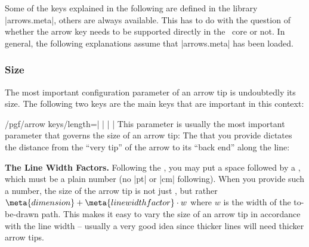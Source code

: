 Some of the keys explained in the following are defined in the library
|arrows.meta|, others are always available. This has to do with the question of
whether the arrow key needs to be supported directly in the \pgfname\ core or
not. In general, the following explanations assume that |arrows.meta| has been
loaded.


\subsubsection{Size}

The most important configuration parameter of an arrow tip is undoubtedly its
size. The following two keys are the main keys that are important in this
context:

\begin{key}{/pgf/arrow keys/length=| |%
        | |}
        \label{length-arrow-key}%
    This parameter is usually the most important parameter that governs the
    size of an arrow tip: The  that you provide dictates the
    distance from the ``very tip'' of the arrow to its ``back end'' along the
    line:
\begin{codeexample}[preamble={\usetikzlibrary{arrows.meta}}]
\end{codeexample}
\begin{codeexample}[preamble={\usetikzlibrary{arrows.meta}}]
\end{codeexample}
\begin{codeexample}[preamble={\usetikzlibrary{arrows.meta}}]
\end{codeexample}

    \medskip
    \noindent \textbf{The Line Width Factors.}
    Following the , you may put a space followed by a
    , which must be a plain number (no |pt| or |cm|
    following). When you provide such a number, the size of the arrow tip is
    not just , but rather $\meta{dimension} + \meta{line width
    factor}\cdot w$ where $w$ is the width of the to-be-drawn path. This makes
    it easy to vary the size of an arrow tip in accordance with the line width
    -- usually a very good idea since thicker lines will need thicker arrow
    tips.


\end{key}
